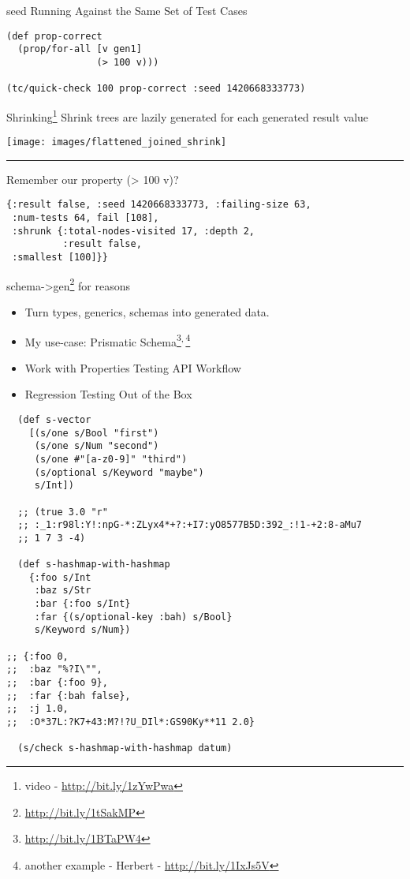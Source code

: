 \documentclass[presentation, bigger]{beamer}
\begin{document}
\begin{frame}[fragile,label=sec-]{seed}
 Running Against the Same Set of Test Cases

\begin{verbatim}
(def prop-correct
  (prop/for-all [v gen1]
                (> 100 v)))

(tc/quick-check 100 prop-correct :seed 1420668333773)
\end{verbatim}
\end{frame}
\begin{frame}[fragile,label=sec-]{Shrinking\footnote{video - \url{http://bit.ly/1zYwPwa}}}
 Shrink trees are \alert{lazily} generated for each generated result value

\begin{center}
 \texttt{[image: images/flattened\_joined\_shrink]}
\end{center}

\rule{\linewidth}{0.5pt}

Remember our property \alert{(> 100 v)}?

\begin{verbatim}
{:result false, :seed 1420668333773, :failing-size 63,
 :num-tests 64, fail [108],
 :shrunk {:total-nodes-visited 17, :depth 2,
          :result false,
 :smallest [100]}}
\end{verbatim}
\end{frame}
\begin{frame}[label=sec-]{schema->gen\footnote{\url{http://bit.ly/1tSakMP}} for reasons}
\begin{itemize}
\item Turn types, generics, schemas into generated data.
\item My use-case: Prismatic Schema\footnote{\url{http://bit.ly/1BTaPW4}}\textsuperscript{,}\,\footnote{another example - Herbert - \url{http://bit.ly/1IxJs5V}}
\item Work with Properties Testing API Workflow
\item Regression Testing Out of the Box
\end{itemize}
\end{frame}
\begin{frame}[fragile,shrink,label=sec-]{}
 \begin{verbatim}
  (def s-vector
    [(s/one s/Bool "first")
     (s/one s/Num "second")
     (s/one #"[a-z0-9]" "third")
     (s/optional s/Keyword "maybe")
     s/Int])

  ;; (true 3.0 "r"
  ;; :_1:r98l:Y!:npG-*:ZLyx4*+?:+I7:yO8577B5D:392_:!1-+2:8-aMu7
  ;; 1 7 3 -4)

  (def s-hashmap-with-hashmap
    {:foo s/Int
     :baz s/Str
     :bar {:foo s/Int}
     :far {(s/optional-key :bah) s/Bool}
     s/Keyword s/Num})

;; {:foo 0,
;;  :baz "%?I\"",
;;  :bar {:foo 9},
;;  :far {:bah false},
;;  :j 1.0,
;;  :O*37L:?K7+43:M?!?U_DIl*:GS90Ky**11 2.0}

  (s/check s-hashmap-with-hashmap datum)
\end{verbatim}
\end{frame}
\end{document}
